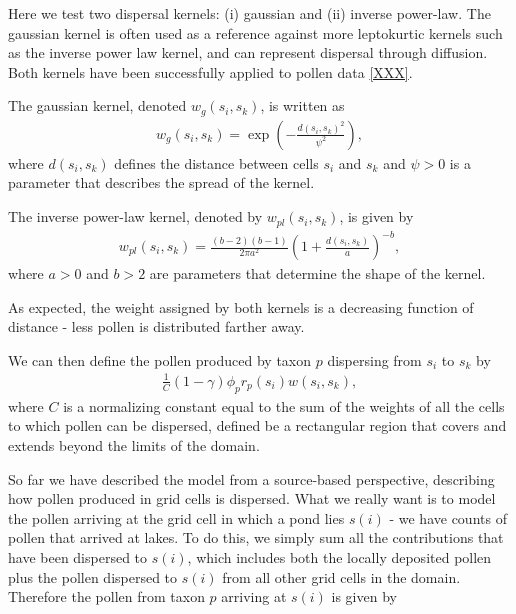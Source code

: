 \documentclass[12pt]{article}
\begin{document}
 Here we test two
dispersal kernels: (i) gaussian and (ii) inverse power-law. The
gaussian kernel is often used as a reference against more leptokurtic
kernels such as the inverse power law kernel, and can represent
dispersal through diffusion. Both kernels have been successfully
applied to pollen data \ref{XXX}.

The gaussian kernel, denoted $w_g(s_i,s_k)$, is written as
\begin{align}
w_g(s_i, s_k) = \exp\left( - \frac{d(s_i, s_k)^2}{\psi^2} \right),
\end{align}
where $d(s_i,s_k)$ defines the distance between cells $s_i$ and $s_k$
and $\psi>0$ is a parameter that describes the spread of the kernel. 

The inverse power-law kernel, denoted by $w_{pl}(s_i,s_k)$, is given by
\begin{align}
w_{pl}(s_i, s_k) = \frac{(b-2)(b-1)}{2 \pi a^2} \left( 1 + \frac{d(s_i, s_k)}{a} \right)^{-b},
\end{align}
where $a>0$ and $b>2$ are parameters that determine the shape of the kernel. 

As expected, the weight assigned by both kernels is a decreasing function
of distance - less pollen is distributed farther away.

 
We can then define the pollen produced by taxon $p$ dispersing from
$s_i$ to $s_k$ by
\begin{align}
\frac{1}{C} (1-\gamma) \phi_p r_p(s_i) w(s_i, s_k),
\end{align}
where $C$ is a normalizing constant equal to the sum of the weights of
all the cells to which pollen can be dispersed, defined be a
rectangular region that covers and extends beyond the limits of the domain.



So far we have described the model from a source-based perspective,
describing how pollen produced in grid cells is dispersed. What we
really want is to model the pollen arriving at the grid cell in which
a pond lies $s(i)$ - we have counts of pollen that arrived at
lakes. To do this, we simply sum all the contributions that have been
dispersed to $s(i)$, which includes both the locally deposited pollen
plus the pollen dispersed to $s(i)$ from all other grid
cells in the domain. Therefore the pollen from taxon $p$ arriving at $s(i)$ is given
by
\end{document}
